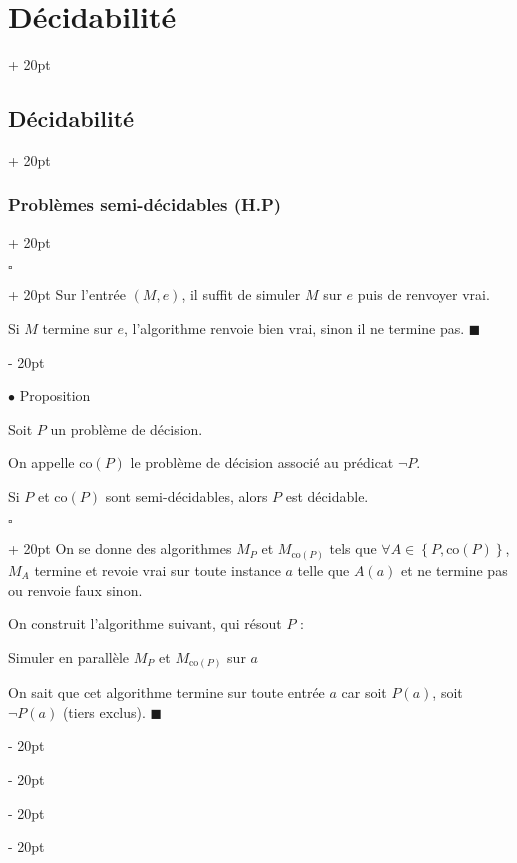\documentclass[a4paper, 12pt, twoside]{article}
\newenvironment{indalgo}[2][H]{
    \begin{algoBox}
        \begin{algorithm}[#1]
            \caption{#2}
}
{
        \end{algorithm}
    \end{algoBox}
}
\newcommand{\set}[1]{\left\{ #1 \right\}}
\newcommand{\ind}[1][20pt]{\advance\leftskip + #1}
\newcommand{\deind}[1][20pt]{\advance\leftskip - #1}
\newenvironment{indt}[2][20pt]{#2 \par \ind[#1]}{\par \deind} %
\newenvironment{proof}[1][{}]{\begin{indt}{$\square$ #1}}{$\blacksquare$ \end{indt}}
\begin{document}
\begin{indt}{\section{Décidabilité}}
\begin{indt}{\subsection{Décidabilité}}
\begin{indt}{\subsubsection{Problèmes semi-décidables (H.P)}}
                \vspace{6pt}
                
                \begin{proof}
                    Sur l'entrée $(M, e)$, il suffit de simuler $M$ sur $e$ puis de renvoyer vrai.

                    Si $M$ termine sur $e$, l'algorithme renvoie bien vrai, sinon il ne termine pas.
                \end{proof}

                \vspace{12pt}
                
                $\bullet$ Proposition
                \begin{emphBox}
                    Soit $P$ un problème de décision.

                    On appelle $\mathrm{co}(P)$ le problème de décision associé au prédicat $\neg P$.

                    Si $P$ et $\mathrm{co}(P)$ sont semi-décidables, alors $P$ est décidable.
                \end{emphBox}

                \vspace{6pt}
                
                \begin{proof}
                    On se donne des algorithmes $M_P$ et $M_{\mathrm{co}(P)}$ tels que $\forall A \in \set{P, \mathrm{co}(P)}$, $M_A$ termine et revoie vrai sur toute instance $a$ telle que $A(a)$ et ne termine pas ou renvoie faux sinon.

                    On construit l'algorithme suivant, qui résout $P$ :

                    \begin{indalgo}{}

                        \BlankLine

                        Simuler en parallèle $M_P$ et $M_{\mathrm{co}(P)}$ sur $a$\;

                    \end{indalgo}

                    On sait que cet algorithme termine sur toute entrée $a$ car soit $P(a)$, soit $\neg P(a)$ (tiers exclus).
                \end{proof}


\end{indt}
\end{indt}
\end{indt}
\end{document}
